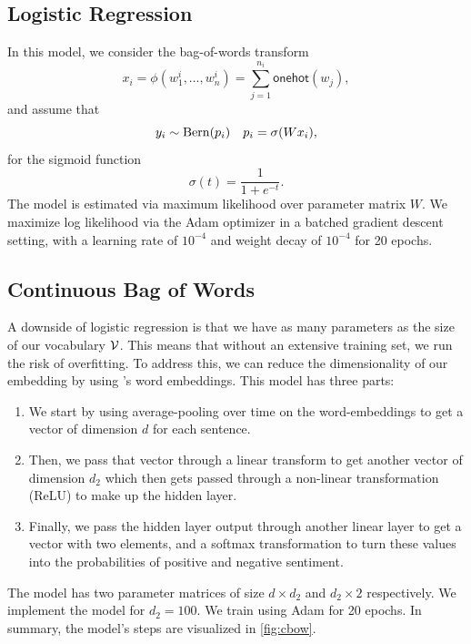 \documentclass[11pt]{article}
\begin{document}
\subsection{Logistic Regression}
\label{subsec:logistic}

In this model,  we consider the bag-of-words transform \[x_i = \phi
(w_1^i,\ldots,w_n^i) =
\sum_{j=1}^{n_i} \mathsf{onehot}(w_j),\] and assume that \[
y_i \sim \operatorname{Bern}(p_i) \quad p_i = \sigma(Wx_i),
\]
for the sigmoid function \[
\sigma(t) = \frac{1}{1+e^{-t}}. 
\]
The model is estimated via maximum likelihood over parameter matrix $W$. We
maximize log likelihood via the Adam optimizer in a batched gradient descent
setting, with a learning rate of $10^{-4}$
and weight decay of $10^{-4}$ for 20 epochs. 



\subsection{Continuous Bag of Words}
\label{subsec:cbow}

A downside of logistic regression is that we have as many parameters as the size
of our vocabulary $\mathcal{V}$. This means that without an extensive training set, we
run the risk of overfitting. To address this, we can reduce the dimensionality
of our embedding by using \citet{mikolov2013efficient}'s word embeddings. This model has three parts:

\begin{enumerate}
\item We start by using average-pooling over time on the word-embeddings to get
a vector of dimension $d$ for each sentence.
\item Then, we pass that vector through a linear transform to get another vector
of dimension $d_2$ which then gets passed through a non-linear transformation
(ReLU) to make up the hidden layer.
\item Finally, we pass the hidden layer output through another linear layer to
get a vector with two elements, and a softmax transformation to turn these
values into the probabilities of positive and negative sentiment.
\end{enumerate}

The model has two parameter matrices of size $d \times d_2$ and $d_2 \times 2$
respectively. We implement the model for $d_2=100$. We train using Adam for 20
epochs. In summary, the model's steps are visualized in \cref{fig:cbow}.
\end{document}
